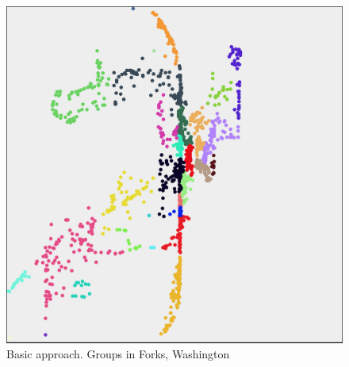 \begin{figure}[h]
	\center
	\includegraphics[scale=0.35]{Images/computations/BASICForks.jpg}
	\caption{Basic approach. Groups in Forks, Washington}
	\label{fig:basic_forks}
\end{figure}



%

